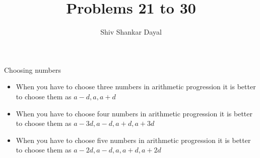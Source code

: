 \documentclass[aspectratio=1610,8pt]{beamer}
\title{Problems 21 to 30}
\author[Shiv Shankar Dayal]{Shiv Shankar Dayal}
\begin{document}
\begin{frame}
       \titlepage
\end{frame}
\begin{frame}{Choosing numbers}
  \begin{itemize}
    \item When you have to choose three numbers in arithmetic progression it is
      better to choose them as $a - d, a, a + d$
    \item When you have to choose four numbers in arithmetic progression it is
      better to choose them as $a-3d, a - d, a + d, a + 3d$
    \item When you have to choose five numbers in arithmetic progression it is
      better to choose them as $a-2d, a - d, a, a + d, a + 2d$
  \end{itemize}
\end{frame}
\end{document}
